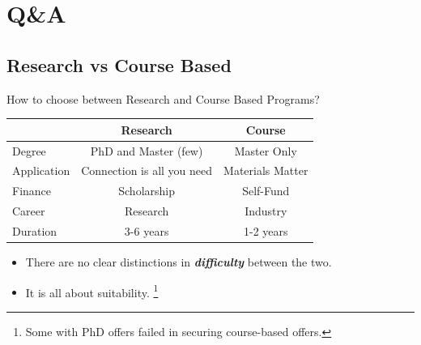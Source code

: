 \documentclass[UTF8]{beamer}
\begin{document}
\section{Q\&A}

\subsection{Research vs Course Based}
\begin{frame}{How to choose between Research and Course Based Programs?}
  \begin{table}[h]
    \centering
    \begin{tabular}{l|c|c}

      \toprule
      & Research& Course\\
      \midrule
      Degree & PhD and Master (\small{few}) & Master Only \\
      Application & Connection is all you need &  Materials Matter \\
      Finance & Scholarship & Self-Fund \\
      Career & Research & Industry \\
      Duration & 3-6 years & 1-2 years \\

      \bottomrule
    \end{tabular}
  \end{table}

  \begin{itemize}
    \item There are no clear distinctions in \textbf{\textit{difficulty}} between the two.
    \item It is all about suitability. \footnote{Some with PhD offers failed in securing course-based offers.}
  \end{itemize}
\end{frame}

%
\end{document}
